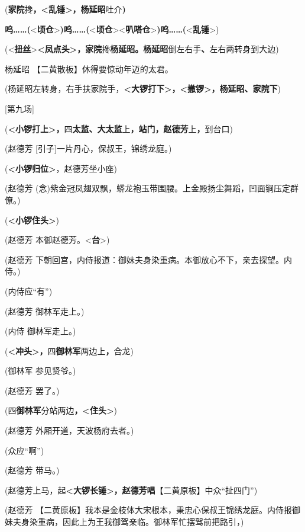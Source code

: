 (\textbf{家院}搀\textbf{，\textless{}乱锤\textgreater{}，杨延昭}吐介\textbf{)}

\textbf{呜\ldots{}\ldots{}(}\textless{}\textbf{顷仓}\textgreater{}\textbf{)呜\ldots{}\ldots{}(}\textless{}\textbf{顷仓}\textgreater{}\textless{}\textbf{叭嗒仓}\textgreater{}\textbf{)呜\ldots{}\ldots{}(}\textless{}\textbf{乱锤}\textgreater{})

(\textless{}\textbf{扭丝}\textgreater{}\textbf{\textless{}凤点头\textgreater{}，家院}搀\textbf{杨延昭。杨延昭}倒左右手\textbf{、}左右两转身到大边)

杨延昭 【二黄散板】休得要惊动年迈的太君。

(杨延昭左转身，右手扶家院手，\textbf{\textless{}大锣打下\textgreater{}，\textless{}撤锣\textgreater{}，杨延昭、家院下})

{[}第九场{]}

(\textbf{\textless{}小锣打上\textgreater{}，}四\textbf{太监、大太监}上\textbf{，站门，赵德芳}上\textbf{，}到台口)

(赵德芳 {[}引子{]}一片丹心，保叔王，锦绣龙庭。)

(\textbf{\textless{}小锣归位\textgreater{}}，赵德芳坐小座)

(赵德芳
(念)紫金冠凤翅双飘，蟒龙袍玉带围腰。上金殿扬尘舞蹈，凹面锏压定群僚。)

(\textbf{\textless{}小锣住头\textgreater{}})

(赵德芳 本御赵德芳。\textless{}\textbf{台}\textgreater{})

(赵德芳
下朝回宫，内侍报道：御妹夫身染重病。本御放心不下，亲去探望。内侍。)

(内侍应``有'')

(赵德芳 御林军走上。)

(内侍 御林军走上。)

(\textbf{\textless{}冲头\textgreater{}，}四\textbf{御林军}两边上\textbf{，}合龙)

(御林军 参见贤爷。)

(赵德芳 罢了。)

(四\textbf{御林军}分站两边\textbf{，\textless{}住头\textgreater{}})

(赵德芳 外厢开道，天波杨府去者。)

(众应``啊'')

(赵德芳 带马。)

(赵德芳上马，起\textbf{\textless{}大锣长锤\textgreater{}，赵德芳唱}【二黄原板】中众``扯四门'')

(赵德芳
【二黄原板】我本是金枝体大宋根本，秉忠心保叔王锦绣龙庭。内侍报御妹夫身染重病，因此上为王我御驾亲临。御林军忙摆驾前把路引，)

